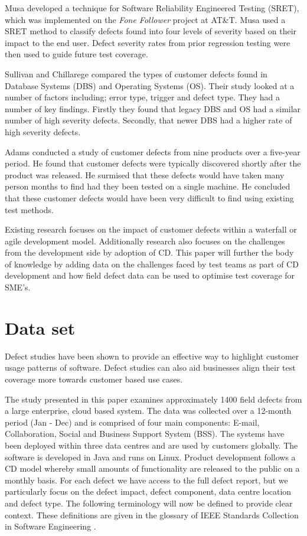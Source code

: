 \documentclass[conference]{IEEEtran}
\begin{document}
Musa \cite{musa1996software} developed a technique for Software Reliability Engineered Testing (SRET), which was implemented on the \emph{Fone Follower} project at AT\&T. Musa used a SRET method to classify defects found into four levels of severity based on their impact to the end user. Defect severity rates from prior regression testing were then used to guide future test coverage. \par
Sullivan and Chillarege \cite{sullivan1992comparison} compared the types of customer defects found in Database Systems (DBS) and Operating Systems (OS). Their study looked at a number of factors including; error type, trigger and defect type. They had a number of key findings. Firstly they found that legacy DBS and OS had a similar number of high severity defects. Secondly, that newer DBS had a higher rate of high severity defects. \par
Adams \cite{adams1984optimizing} conducted a study of customer defects from nine products over a five-year period. He found that customer defects were typically discovered shortly after the product was released. He surmised that these defects would have taken many person months to find had they been tested on a single machine. He concluded that these customer defects would have been very difficult to find using existing test methods. \par
Existing research focuses on the impact of customer defects within a waterfall or agile development model. Additionally research also focuses on the challenges from the development side by adoption of CD. This paper will further the body of knowledge by adding data on the challenges faced by test teams as part of CD development and how field defect data can be used to optimise test coverage for SME's.

\section{Data set}

Defect studies have been shown to provide an effective way to highlight customer usage patterns of software. Defect studies can also aid businesses align their test coverage more towards customer based use cases. \par
The study presented in this paper examines approximately 1400 field defects from a large enterprise, cloud based system. The data was collected over a 12-month period (Jan - Dec) and is comprised of four main components: E-mail, Collaboration, Social and Business Support System (BSS). The systems have been deployed within three data centres and are used by customers globally. The software is developed in Java and runs on Linux. Product development follows a CD model whereby small amounts of functionality are released to the public on a monthly basis.  For each defect we have access to the full defect report, but we particularly focus on the defect impact, defect component, data centre location and defect type. 
The following terminology will now be defined to provide clear context. These definitions are given in the glossary of IEEE Standards Collection in Software Engineering \cite{ieee1998ieee}. 
\end{document}
